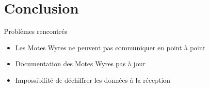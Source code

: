 \documentclass{beamer}
\begin{document}
\section{Conclusion}
\begin{frame}
	\begin{block}{Problèmes rencontrés}
		\begin{itemize}
			\item Les Motes Wyres ne peuvent pas communiquer en point à point
			\item Documentation des Motes Wyres pas à jour
			\item Impossibilité de déchiffrer les données à la réception
		\end{itemize}
	\end{block}
\end{frame}
\end{document}
